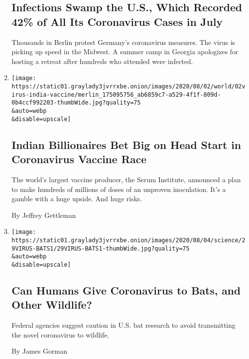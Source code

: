 \begin{enumerate}
{  \subsection{Infections Swamp the U.S., Which Recorded 42\% of All Its
  Coronavirus Cases in
  July}\label{infections-swamp-the-us-which-recorded-42-of-all-its-coronavirus-cases-in-july}}

  Thousands in Berlin protest Germany's coronavirus measures. The virus
  is picking up speed in the Midwest. A summer camp in Georgia
  apologizes for hosting a retreat after hundreds who attended were
  infected.
\item
  \href{/2020/08/01/world/asia/coronavirus-vaccine-india.html}{}

  \texttt{[image: https://static01.graylady3jvrrxbe.onion/images/2020/08/02/world/02virus-india-vaccine/merlin\_175095756\_ab6859c7-a529-4f1f-809d-0b4ccf992203-thumbWide.jpg?quality=75\\\&auto=webp\\\&disable=upscale]}

  \hypertarget{indian-billionaires-bet-big-on-head-start-in-coronavirus-vaccine-race}{%
  \subsection{Indian Billionaires Bet Big on Head Start in Coronavirus
  Vaccine
  Race}\label{indian-billionaires-bet-big-on-head-start-in-coronavirus-vaccine-race}}

  The world's largest vaccine producer, the Serum Institute, announced a
  plan to make hundreds of millions of doses of an unproven inoculation.
  It's a gamble with a huge upside. And huge risks.

  By Jeffrey Gettleman
\item
  \href{/2020/08/01/science/Covid-bats.html}{}

  \texttt{[image: https://static01.graylady3jvrrxbe.onion/images/2020/08/04/science/29VIRUS-BATS1/29VIRUS-BATS1-thumbWide.jpg?quality=75\\\&auto=webp\\\&disable=upscale]}

  \hypertarget{can-humans-give-coronavirus-to-bats-and-other-wildlife}{%
  \subsection{Can Humans Give Coronavirus to Bats, and Other
  Wildlife?}\label{can-humans-give-coronavirus-to-bats-and-other-wildlife}}

  Federal agencies suggest caution in U.S. bat research to avoid
  transmitting the novel coronavirus to wildlife.

  By James Gorman
\end{enumerate}

